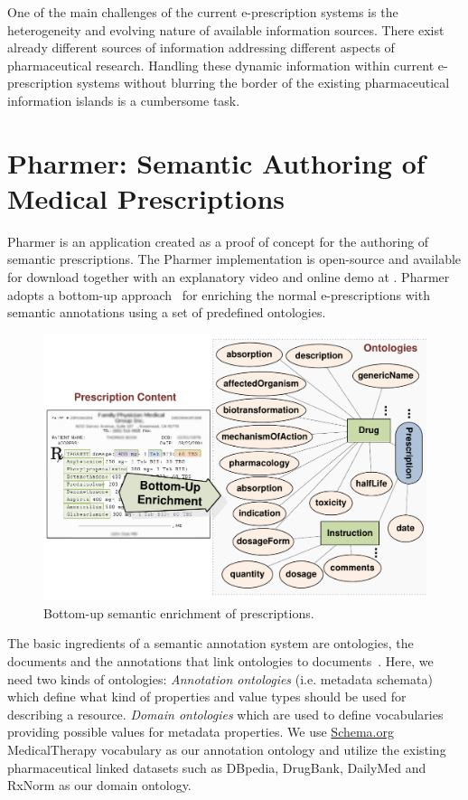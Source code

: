 \documentclass[conference]{IEEEtran}
\begin{document}
One of the main challenges of the current e-prescription systems is the heterogeneity and evolving nature of available information sources.
There exist already different sources of information addressing different aspects of pharmaceutical research.
Handling these dynamic information within current e-prescription systems without blurring the border of the existing pharmaceutical information islands is a cumbersome task.

\section{Pharmer: Semantic Authoring of Medical Prescriptions}
\label{sec:pharmer}
Pharmer is an application created as a proof of concept for the authoring of semantic prescriptions.
The Pharmer implementation is open-source and available for download together with an explanatory video and online demo at \cite{pharmerproject}.
Pharmer adopts a bottom-up approach~\cite{khalili2012} for enriching the normal e-prescriptions with semantic annotations using a set of predefined ontologies.

\begin{figure}[tb]
	\centering
		\includegraphics[width=1.0\columnwidth]{../images/approaches.pdf}
	\caption{Bottom-up semantic enrichment of prescriptions.}
	\label{fig:botup}
\end{figure}

The basic ingredients of a semantic annotation system are ontologies, the documents and the annotations that link ontologies to documents~\cite{khalili2012}.
Here, we need two kinds of ontologies:
\emph{Annotation ontologies} (i.e. metadata schemata) which define what kind of properties and value types should be used for describing a resource.
\emph{Domain ontologies} which are used to define vocabularies providing possible values for metadata properties.
We use \url{Schema.org} MedicalTherapy vocabulary as our annotation ontology and utilize the existing pharmaceutical linked datasets such as DBpedia, DrugBank, DailyMed and RxNorm as our domain ontology.
\end{document}
